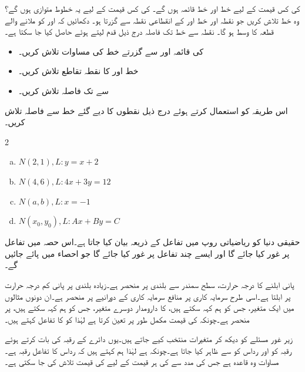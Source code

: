  کی کس قیمت کے لیے خط  اور خط  قائمہ ہوں گے۔ کی کس قیمت کے لیے یہ خطوط متوازی ہوں گے؟
وہ خط تلاش کریں جو نقطہ  اور خط  اور  کے انقطاعی نقطہ سے گزرتا ہو۔
دکھائیں کہ  اور  کو ملانے والے قطعہ کا وسط  ہو گا۔
\quad
نقطہ  سے خط  تک فاصلہ  درج ذیل قدم لیتے ہوئے حاصل کیا جا سکتا ہے۔
\begin{itemize}
\item
{} کی قائمہ اور  سے گزرتے خط  کی مساوات تلاش کریں۔
\item
خط  اور  کا نقطہ تقاطع  تلاش کریں۔
\item
{} سے  تک فاصلہ تلاش کریں۔
\end{itemize}
اس طریقہ کو استعمال کرتے ہوئے درج ذیل نقطوں کا دیے گئے خط سے فاصلہ تلاش کریں۔
\begin{multicols}{2}
\begin{enumerate}[a)]
\item
$N(2,1), L:y=x+2$
\item
$N(4,6), L:4x+3y=12$
\item
$N(a,b),L:x=-1$
\item
$N(x_0,y_0), L:Ax+By=C$
\end{enumerate}
\end{multicols}

حقیقی دنیا کو ریاضیاتی روپ میں تفاعل کے ذریعہ بیان کیا جاتا ہے۔اس حصہ میں تفاعل پر غور کیا جائے گا اور ایسے چند تفاعل پر غور کیا جائے گا جو احصاء میں پائے جائیں گے۔

 پانی ابلنے کا درجہ حرارت، سطح سمندر سے بلندی پر  منحصر ہے۔زیادہ بلندی پر پانی کم درجہ حرارت پر ابلتا ہے۔اسی طرح سرمایہ کاری پر منافع سرمایہ کاری کے دورانیے پر منحصر ہے۔ان دونوں مثالوں میں ایک متغیر، جس کو ہم  کہہ سکتے ہیں، کا دارومدار دوسرے متغیر، جس کو ہم  کہہ سکتے ہیں، پر منحصر ہے۔چونکہ  کی قیمت مکمل طور پر  تعین کرتا ہے لہٰذا  کو  کا تفاعل کہتے ہیں۔

زیر غور مسئلے کو دیکھ کر متغیرات منتخب کیے جاتے ہیں۔یوں دائرے کے رقبہ کی بات کرتے ہوئے رقبہ کو  اور رداس کو  سے ظاہر کیا جاتا ہے۔چونکہ  ہے لہٰذا ہم کہتے ہیں کہ رداس  کا  تفاعل رقبہ   ہے۔
مساوات  وہ قاعدہ ہے جس کی مدد سے  کی ہر قیمت  کے لیے  کی  قیمت  تلاش کی جا سکتی ہے۔ 

